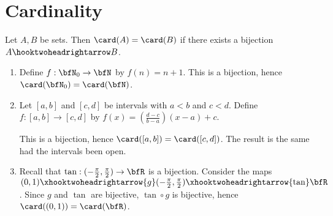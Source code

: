     \section{Cardinality}
        \begin{definition}
            Let $A,B$ be sets. Then $\card(A) = \card(B)$ if there exists a bijection $A \hooktwoheadrightarrow B$.
        \end{definition}

        \begin{example}\label{example:examples-of-cardiality}
            \phantom{a}
            \begin{enumerate}[label = (\arabic*)]
                \item Define $f:\bfN_0 \rightarrow \bfN$ by $f(n)= n+1$. This is a bijection, hence $\card(\bfN_0) = \card(\bfN)$.
                \item Let $[a,b]$ and $[c,d]$ be intervals with $a<b$ and $c<d$. Define $f:[a,b] \rightarrow [c,d]$ by $f(x) = (\frac{d-c}{b-a})(x-a)+c$. 
                    \begin{center}
                    \end{center}
                This is a bijection, hence $\card([a,b]) = \card([c,d])$. The result is the same had the intervals been open.
                \item Recall that $\tan:(-\frac{\pi}{2},\frac{\pi}{2}) \rightarrow \bfR$ is a bijection. Consider the maps $(0,1) \xhooktwoheadrightarrow{g} (-\frac{\pi}{2},\frac{\pi}{2}) \xhooktwoheadrightarrow{\tan} \bfR$. Since $g$ and $\tan$ are bijective, $\tan \circ g$ is bijective, hence $\card((0,1)) = \card(\bfR)$.
            \end{enumerate}
        \end{example}

